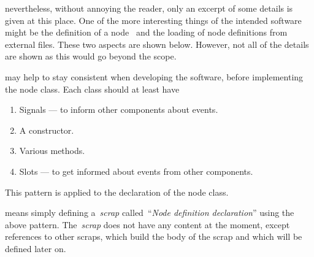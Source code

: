 \documentclass[%
    a4paper,    %
    justified,  %
    nobib,      %
    openany     %
]{tufte-book}
\begin{document}
 nevertheless,
without annoying the reader, only an excerpt of some details is given at this
place. One of the more interesting things of the intended software might
be the definition of a node~ and the loading of node definitions from external files. These two
aspects are shown below. However, not all of the details are shown as this would
go beyond the scope.

 may help to stay
consistent when developing the software, before implementing the node class.
Each class should at least have
\begin{enumerate}
  \item Signals --- to inform other components about events.
  \item A constructor.
  \item Various methods.
  \item Slots --- to get informed about events from other components.
\end{enumerate}
This pattern is applied to the declaration of the node class.

\newpage{}

 means simply defining a~\emph{scrap}
called~\enquote{\emph{Node definition declaration}} using the above pattern.
The~\emph{scrap} does not have any content at the moment, except references to
other scraps, which build the body of the scrap and which will be defined later
on.
\end{document}
